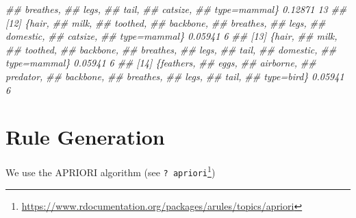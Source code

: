 \documentclass[
  notitlepage]{book}
\newenvironment{Shaded}{\begin{snugshade}}{\end{snugshade}}
\newcommand{\CommentTok}[1]{\textcolor[rgb]{0.56,0.35,0.01}{\textit{#1}}}
\DeclareRobustCommand{\href}[2]{#2\footnote{\url{#1}}}
\begin{document}
\begin{Shaded}
\begin{Highlighting}[]
\CommentTok{\#\#       breathes,                 }
\CommentTok{\#\#       legs,                     }
\CommentTok{\#\#       tail,                     }
\CommentTok{\#\#       catsize,                  }
\CommentTok{\#\#       type=mammal\} 0.12871    13}
\CommentTok{\#\# [12] \{hair,                     }
\CommentTok{\#\#       milk,                     }
\CommentTok{\#\#       toothed,                  }
\CommentTok{\#\#       backbone,                 }
\CommentTok{\#\#       breathes,                 }
\CommentTok{\#\#       legs,                     }
\CommentTok{\#\#       domestic,                 }
\CommentTok{\#\#       catsize,                  }
\CommentTok{\#\#       type=mammal\} 0.05941     6}
\CommentTok{\#\# [13] \{hair,                     }
\CommentTok{\#\#       milk,                     }
\CommentTok{\#\#       toothed,                  }
\CommentTok{\#\#       backbone,                 }
\CommentTok{\#\#       breathes,                 }
\CommentTok{\#\#       legs,                     }
\CommentTok{\#\#       tail,                     }
\CommentTok{\#\#       domestic,                 }
\CommentTok{\#\#       type=mammal\} 0.05941     6}
\CommentTok{\#\# [14] \{feathers,                 }
\CommentTok{\#\#       eggs,                     }
\CommentTok{\#\#       airborne,                 }
\CommentTok{\#\#       predator,                 }
\CommentTok{\#\#       backbone,                 }
\CommentTok{\#\#       breathes,                 }
\CommentTok{\#\#       legs,                     }
\CommentTok{\#\#       tail,                     }
\CommentTok{\#\#       type=bird\}   0.05941     6}
\end{Highlighting}
\end{Shaded}

\hypertarget{rule-generation}{%
\section{Rule Generation}\label{rule-generation}}

We use the APRIORI algorithm (see
\href{https://www.rdocumentation.org/packages/arules/topics/apriori}{\texttt{?\ apriori}})
\end{document}
